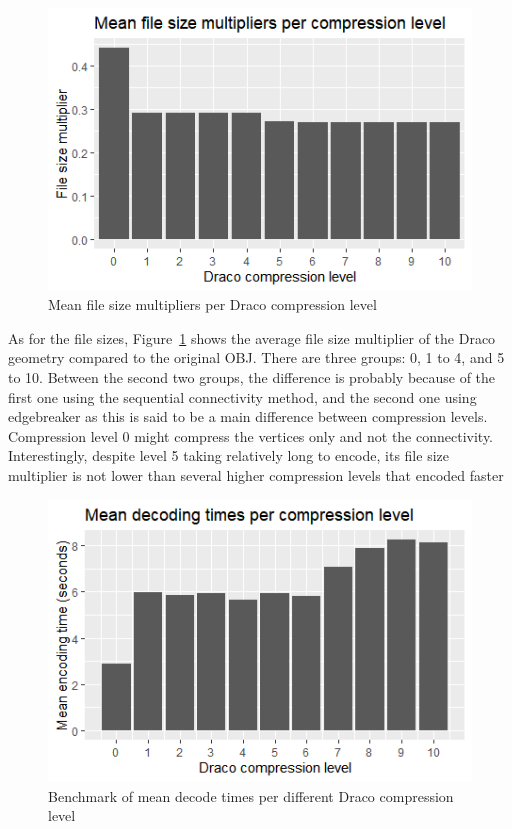 \begin{figure}[h!]
    \includegraphics[scale=1]{figs/implementation/meanfilesize.png}
    \caption{Mean file size multipliers per Draco compression level}
    \label{fig:drcfilesizes}
\end{figure}

As for the file sizes, Figure~\ref{fig:drcfilesizes} shows the average file size multiplier of the Draco geometry compared to the original OBJ.
There are three groups: 0, 1 to 4, and 5 to 10.
Between the second two groups, the difference is probably because of the first one using the sequential connectivity method, and the second one using edgebreaker as this is said to be a main difference between compression levels.
Compression level 0 might compress the vertices only and not the connectivity.
Interestingly, despite level 5 taking relatively long to encode, its file size multiplier is not lower than several higher compression levels that encoded faster


\begin{figure}[h!]
    \includegraphics[scale=1]{figs/implementation/meandecodingtimes.png}
    \caption{Benchmark of mean decode times per different Draco compression level}
    \label{fig:drcdecodingtimes}
\end{figure}

